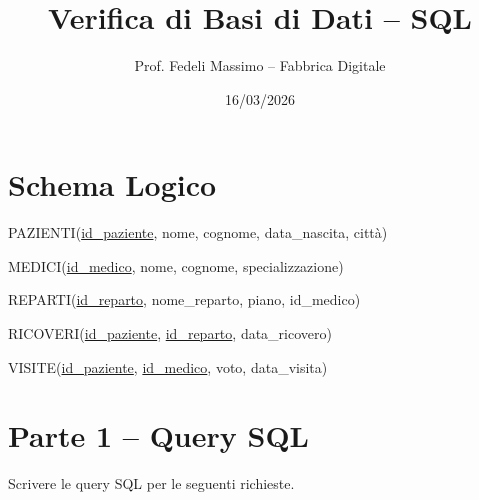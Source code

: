 \documentclass[a4paper,12pt]{article}
\title{Verifica di Basi di Dati -- SQL}
\author{Prof. Fedeli Massimo -- Fabbrica Digitale}
\date{16/03/2026}
\begin{document}
	
	\maketitle
	
	\section*{Schema Logico}
	
	PAZIENTI(\underline{id\_paziente}, nome, cognome, data\_nascita, citt\`a)
	
	MEDICI(\underline{id\_medico}, nome, cognome, specializzazione)
	
	REPARTI(\underline{id\_reparto}, nome\_reparto, piano, id\_medico)
	
	RICOVERI(\underline{id\_paziente}, \underline{id\_reparto}, data\_ricovero)
	
	VISITE(\underline{id\_paziente}, \underline{id\_medico}, voto, data\_visita)
	
	
	\section*{Parte 1 -- Query SQL}
	
	Scrivere le query SQL per le seguenti richieste.
	
\end{document}
